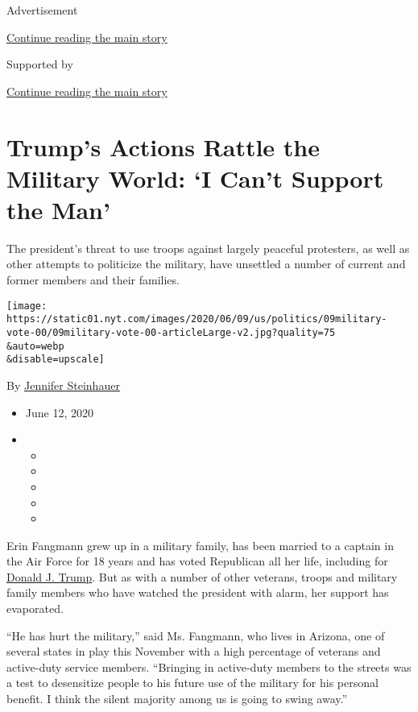 Advertisement

\protect\hyperlink{after-top}{Continue reading the main story}

Supported by

\protect\hyperlink{after-sponsor}{Continue reading the main story}

\hypertarget{trumps-actions-rattle-the-military-world-i-cant-support-the-man}{%
\section{Trump's Actions Rattle the Military World: `I Can't Support the
Man'}\label{trumps-actions-rattle-the-military-world-i-cant-support-the-man}}

The president's threat to use troops against largely peaceful
protesters, as well as other attempts to politicize the military, have
unsettled a number of current and former members and their families.

\texttt{[image: https://static01.nyt.com/images/2020/06/09/us/politics/09military-vote-00/09military-vote-00-articleLarge-v2.jpg?quality=75\\\&auto=webp\\\&disable=upscale]}

By \href{https://www.nytimes.com/by/jennifer-steinhauer}{Jennifer
Steinhauer}

\begin{itemize}
\item
  June 12, 2020
\item
  \begin{itemize}
  \item
  \item
  \item
  \item
  \item
  \end{itemize}
\end{itemize}

Erin Fangmann grew up in a military family, has been married to a
captain in the Air Force for 18 years and has voted Republican all her
life, including for
\href{https://www.nytimes.com/interactive/2020/us/elections/donald-trump.html}{Donald
J. Trump}. But as with a number of other veterans, troops and military
family members who have watched the president with alarm, her support
has evaporated.

``He has hurt the military,'' said Ms. Fangmann, who lives in Arizona,
one of several states in play this November with a high percentage of
veterans and active-duty service members. ``Bringing in active-duty
members to the streets was a test to desensitize people to his future
use of the military for his personal benefit. I think the silent
majority among us is going to swing away.''

